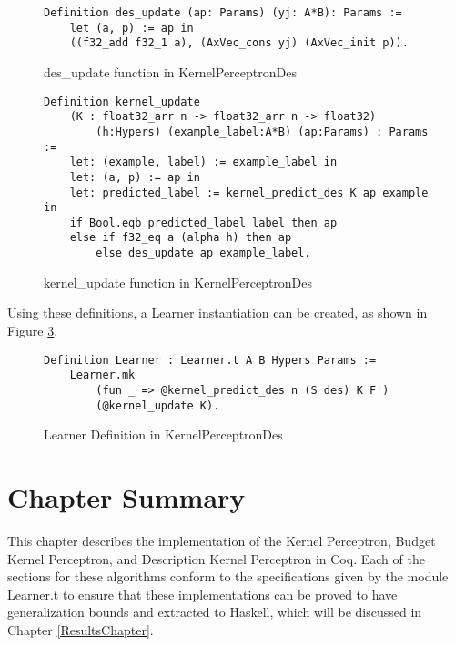 \begin{figure}
    \caption{des\_update function in KernelPerceptronDes}
    \label{des_updateDef}
    \begin{lstlisting}
Definition des_update (ap: Params) (yj: A*B): Params :=      
    let (a, p) := ap in
    ((f32_add f32_1 a), (AxVec_cons yj) (AxVec_init p)).
    \end{lstlisting}
\end{figure}

\begin{figure}
    \caption{kernel\_update function in KernelPerceptronDes}
    \label{kernel_update_desDef}
    \begin{lstlisting}
Definition kernel_update 
    (K : float32_arr n -> float32_arr n -> float32)
        (h:Hypers) (example_label:A*B) (ap:Params) : Params :=
    let: (example, label) := example_label in
    let: (a, p) := ap in 
    let: predicted_label := kernel_predict_des K ap example in
    if Bool.eqb predicted_label label then ap
    else if f32_eq a (alpha h) then ap
        else des_update ap example_label.
    \end{lstlisting}
\end{figure}

Using these definitions, a Learner instantiation can be created, as shown in Figure \ref{kpdLearnerDef}.

\begin{figure}
    \caption{Learner Definition in KernelPerceptronDes}
    \label{kpdLearnerDef}
    \begin{lstlisting}
Definition Learner : Learner.t A B Hypers Params :=
    Learner.mk
        (fun _ => @kernel_predict_des n (S des) K F')
        (@kernel_update K).
    \end{lstlisting}
\end{figure}

\section{Chapter Summary}\label{MethodsChapterSummarySection}
This chapter describes the implementation of the Kernel Perceptron, Budget Kernel Perceptron, and Description Kernel Perceptron in Coq. Each of the sections for these algorithms conform to the specifications given by the module Learner.t to ensure that these implementations can be proved to have generalization bounds and extracted to Haskell, which will be discussed in Chapter \ref{ResultsChapter}. 
